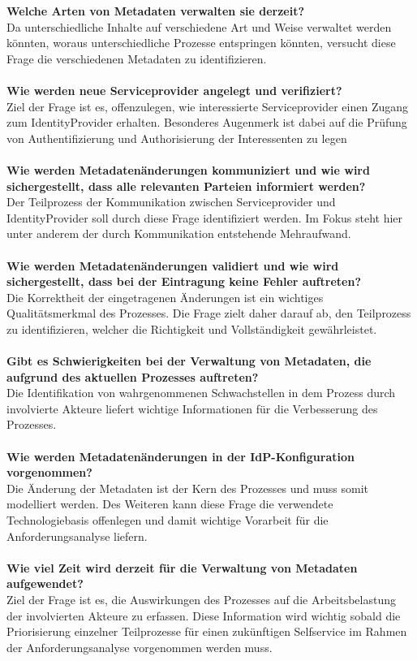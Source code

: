 \documentclass[a4paper, fontsize=11pt]{scrartcl}
\begin{document}
\textbf{Welche Arten von Metadaten verwalten sie derzeit?}\\
Da unterschiedliche Inhalte auf verschiedene Art und Weise verwaltet werden könnten, woraus unterschiedliche Prozesse entspringen könnten, versucht diese Frage die verschiedenen Metadaten zu identifizieren.\\\\
\textbf{Wie werden neue Serviceprovider angelegt und verifiziert?}\\
Ziel der Frage ist es, offenzulegen, wie interessierte Serviceprovider einen Zugang zum IdentityProvider erhalten. Besonderes Augenmerk ist dabei auf die Prüfung von Authentifizierung und Authorisierung der Interessenten zu legen\\\\
\textbf{Wie werden Metadatenänderungen kommuniziert und wie wird sichergestellt, dass alle relevanten Parteien informiert werden?}\\
Der Teilprozess der Kommunikation zwischen Serviceprovider und IdentityProvider soll durch diese Frage identifiziert werden. Im Fokus steht hier unter anderem der durch Kommunikation entstehende Mehraufwand.\\\\
\textbf{Wie werden Metadatenänderungen validiert und wie wird sichergestellt, dass bei der Eintragung keine Fehler auftreten?}\\
Die Korrektheit der eingetragenen Änderungen ist ein wichtiges Qualitätsmerkmal des Prozesses. Die Frage zielt daher darauf ab, den Teilprozess zu identifizieren, welcher die Richtigkeit und Vollständigkeit gewährleistet.\\\\
\textbf{Gibt es Schwierigkeiten bei der Verwaltung von Metadaten, die aufgrund des aktuellen Prozesses auftreten?}\\
 Die Identifikation von wahrgenommenen Schwachstellen in dem Prozess durch involvierte Akteure liefert wichtige Informationen für die Verbesserung des Prozesses.\\\\
\textbf{Wie werden Metadatenänderungen in der IdP-Konfiguration vorgenommen?}\\
Die Änderung der Metadaten ist der Kern des Prozesses und muss somit modelliert werden. Des Weiteren kann diese Frage die verwendete Technologiebasis offenlegen und damit wichtige Vorarbeit für die Anforderungsanalyse liefern.\\\\
\textbf{Wie viel Zeit wird derzeit für die Verwaltung von Metadaten aufgewendet?}\\
Ziel der Frage ist es, die Auswirkungen des Prozesses auf die Arbeitsbelastung der involvierten Akteure zu erfassen. Diese Information wird wichtig sobald die Priorisierung einzelner Teilprozesse für einen zukünftigen Selfservice im Rahmen der Anforderungsanalyse vorgenommen werden muss.\\\\
\end{document}

